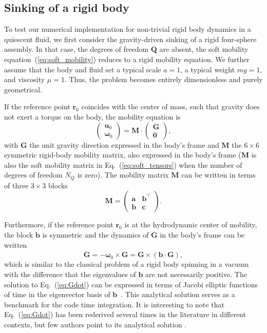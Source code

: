 \documentclass[aps,prfluids,groupedaddress]{revtex4-2}
\newcommand{\br}{\bm{r}}
\newcommand{\bu}{\bm{u}}
\newcommand{\bomega}{\bm{\omega}}
\newcommand{\bG}{\bm{G}}
\newcommand{\bQ}{\bm{Q}}
\newcommand{\ta}{\bm{{a}}}
\newcommand{\tb}{\bm{{b}}}
\newcommand{\tc}{\bm{{c}}}
\newcommand{\tM}{\bm{{M}}}
\newcommand{\bGd}{\bm{{\dot G}}}
\begin{document}
\subsection{Sinking of a rigid body}
To test our numerical implementation for non-trivial rigid body dynamics in a quiescent fluid, we first consider the gravity-driven sinking of a rigid four-sphere assembly.
In that case, the degrees of freedom $\bQ$ are absent, the soft mobility equation~(\ref{eq:soft_mobility}) reduces to a rigid mobility equation. We further assume that the body and fluid set a typical scale $a=1$, a typical weight $mg=1$, and viscosity $\mu=1$. Thus, the problem becomes entirely dimensionless and purely geometrical. 

If the reference point $\br_0$ coincides with the center of mass, such that gravity does not exert a torque on the body, the mobility equation is
\begin{equation}\label{eq:rigid_mobility_body} 
\left(
\begin{array}{c}
	\bu_0 \\[0.5ex]
	\bomega_0 
\end{array}
\right) =
  \tM \cdot 
\left(
\begin{array}{c}
	\bG \\[0.5ex]
	\mathbf{0} 
\end{array}
\right),
\end{equation}
with $\bG$ the unit gravity direction expressed in the body's frame and $\tM$ the $6\times 6$ symmetric rigid-body mobility matrix, also expressed in the body's frame ($\tM$ is also the soft mobility matrix in Eq.~(\ref{eq:soft_tensors}) when the number of degrees of freedom $N_Q$ is zero). The mobility matrix $\tM$ can be written in terms of three $3\times 3$ blocks   
\begin{equation}
\tM = \begin{pmatrix} \ta & \tb^\top \\ \tb & \tc \end{pmatrix}. 
\end{equation}

Furthermore, if the reference point $\br_0$ is at the hydrodynamic center of mobility, the block $\tb$ is symmetric \cite{Kim2013} and the dynamics of $\bG$ in the body's frame can be written~\cite{Gonzalez2004}
\begin{equation}\label{eq:Gdot}
\bGd = -\bomega_0 \times \bG = \bG \times \left( \tb \cdot \bG\right),
\end{equation}
which is similar to the classical problem of a rigid body spinning in a vacuum~\cite{Marsden2013} with the difference that the eigenvalues of $\tb$ are not necessarily positive. The solution to Eq.~(\ref{eq:Gdot}) can be expressed in terms of Jacobi elliptic functions of time in the eigenvector basis of $\tb$~\cite{Marsden2013}. 
This analytical solution serves as a benchmark for the code time integration.
It is interesting to note that Eq.~(\ref{eq:Gdot}) has been rederived several times in the literature in different contexts, but few authors point to its analytical solution \cite{Weinberger1972, Gonzalez2004, Weber2013, Palusa2018, Braverman2020, Witten2020, Miara2024, Huseby2025, Joshi2025}.
\end{document}
